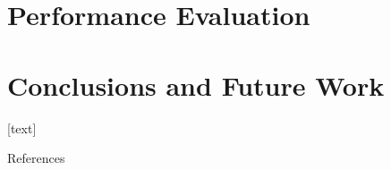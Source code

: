 \documentclass[t, aspectratio=169]{beamer}
\begin{document}
    \section{Performance Evaluation}
    
    
    \section{Conclusions and Future Work}
    
    
    \useStyleLogoOnly 
    [text]
    
    \begin{frame}[allowframebreaks, label=refs]{References}
        \tiny
        \printbibliography[heading=none]
    \end{frame}
\end{document}
